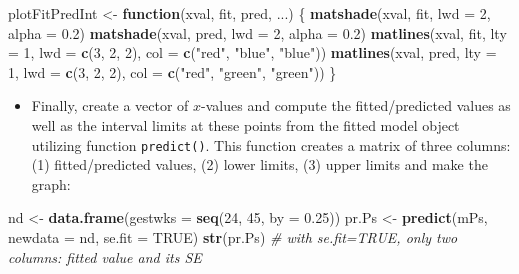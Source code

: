 \documentclass[
]{book}
\newenvironment{Shaded}{\begin{snugshade}}{\end{snugshade}}
\newcommand{\AttributeTok}[1]{\textcolor[rgb]{0.13,0.29,0.53}{#1}}
\newcommand{\CommentTok}[1]{\textcolor[rgb]{0.56,0.35,0.01}{\textit{#1}}}
\newcommand{\ConstantTok}[1]{\textcolor[rgb]{0.56,0.35,0.01}{#1}}
\newcommand{\ControlFlowTok}[1]{\textcolor[rgb]{0.13,0.29,0.53}{\textbf{#1}}}
\newcommand{\DecValTok}[1]{\textcolor[rgb]{0.00,0.00,0.81}{#1}}
\newcommand{\FloatTok}[1]{\textcolor[rgb]{0.00,0.00,0.81}{#1}}
\newcommand{\FunctionTok}[1]{\textcolor[rgb]{0.13,0.29,0.53}{\textbf{#1}}}
\newcommand{\NormalTok}[1]{#1}
\newcommand{\OtherTok}[1]{\textcolor[rgb]{0.56,0.35,0.01}{#1}}
\newcommand{\StringTok}[1]{\textcolor[rgb]{0.31,0.60,0.02}{#1}}
\providecommand{\tightlist}{%
  \setlength{\itemsep}{0pt}\setlength{\parskip}{0pt}}
\begin{document}
\begin{Shaded}
\begin{Highlighting}[]
\NormalTok{plotFitPredInt }\OtherTok{\textless{}{-}} \ControlFlowTok{function}\NormalTok{(xval, fit, pred, ...) \{}
  \FunctionTok{matshade}\NormalTok{(xval, fit, }\AttributeTok{lwd =} \DecValTok{2}\NormalTok{, }\AttributeTok{alpha =} \FloatTok{0.2}\NormalTok{)}
  \FunctionTok{matshade}\NormalTok{(xval, pred, }\AttributeTok{lwd =} \DecValTok{2}\NormalTok{, }\AttributeTok{alpha =} \FloatTok{0.2}\NormalTok{)}
  \FunctionTok{matlines}\NormalTok{(xval, fit, }\AttributeTok{lty =} \DecValTok{1}\NormalTok{, }\AttributeTok{lwd =} \FunctionTok{c}\NormalTok{(}\DecValTok{3}\NormalTok{, }\DecValTok{2}\NormalTok{, }\DecValTok{2}\NormalTok{), }\AttributeTok{col =} \FunctionTok{c}\NormalTok{(}\StringTok{"red"}\NormalTok{, }\StringTok{"blue"}\NormalTok{, }\StringTok{"blue"}\NormalTok{))}
  \FunctionTok{matlines}\NormalTok{(xval, pred, }\AttributeTok{lty =} \DecValTok{1}\NormalTok{, }\AttributeTok{lwd =} \FunctionTok{c}\NormalTok{(}\DecValTok{3}\NormalTok{, }\DecValTok{2}\NormalTok{, }\DecValTok{2}\NormalTok{), }\AttributeTok{col =} \FunctionTok{c}\NormalTok{(}\StringTok{"red"}\NormalTok{, }\StringTok{"green"}\NormalTok{, }\StringTok{"green"}\NormalTok{))}
\NormalTok{\}}
\end{Highlighting}
\end{Shaded}

\begin{itemize}
\tightlist
\item
  Finally, create a vector of \(x\)-values and compute
  the fitted/predicted values as well
  as the interval limits at these points from the fitted
  model object utilizing
  function \texttt{predict()}.
  This function creates a matrix of three columns: (1) fitted/predicted
  values, (2) lower limits, (3) upper limits and
  make the graph:
\end{itemize}

\begin{Shaded}
\begin{Highlighting}[]
\NormalTok{nd }\OtherTok{\textless{}{-}} \FunctionTok{data.frame}\NormalTok{(}\AttributeTok{gestwks =} \FunctionTok{seq}\NormalTok{(}\DecValTok{24}\NormalTok{, }\DecValTok{45}\NormalTok{, }\AttributeTok{by =} \FloatTok{0.25}\NormalTok{))}
\NormalTok{pr.Ps }\OtherTok{\textless{}{-}} \FunctionTok{predict}\NormalTok{(mPs, }\AttributeTok{newdata =}\NormalTok{ nd, }\AttributeTok{se.fit =} \ConstantTok{TRUE}\NormalTok{)}
\FunctionTok{str}\NormalTok{(pr.Ps) }\CommentTok{\# with se.fit=TRUE, only two columns: fitted value and its SE}
\end{Highlighting}
\end{Shaded}
\end{document}
